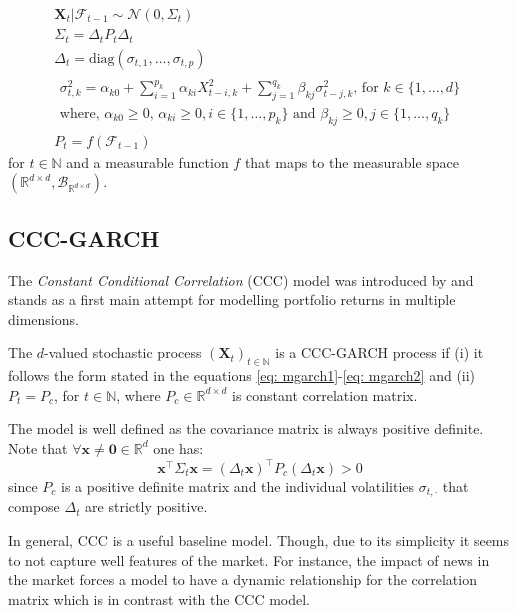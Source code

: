 \documentclass[a4paper, oneside]{discothesis}
\begin{document}
\begin{gather}
    \mathbf{X}_t|\mathcal{F}_{t-1}\sim\mathcal{N}(0, \Sigma_t)\label{eq: mgarch1}\\
    \Sigma_t = \Delta_t P_t \Delta_t\\
    \Delta_t = \text{diag}(\sigma_{t, 1}, \dots, \sigma_{t,p})\\
    \begin{split}\label{eq: mgarch2}
    \sigma_{t, k}^2 = \alpha_{k0}+\sum_{i=1}^{p_k}\alpha_{ki}X^2_{t-i, k}+\sum_{j=1}^{q_k}\beta_{kj}\sigma^2_{t-j, k}\text{, for }k\in\{1,\dots ,d \}\\ \text{where, } \alpha_{k0} \geq 0\text{, } \alpha_{ki}\geq0, i\in\{1, \dots, p_k\}\text{ and } \beta_{kj}\geq0, j\in\{1, \dots, q_k\}
    \end{split}\\
    P_t = f(\mathcal{F}_{t-1})
\end{gather}
for $t\in \mathbb{N}$ and a measurable function $f$ that maps to the measurable space $\left( \mathbb{R}^{d\times d}, \mathcal{B}_{\mathbb{R}^{d\times d}} \right)$.

\subsection{CCC-GARCH}
The \textit{Constant Conditional Correlation} (CCC) model was introduced by \cite{CCC} and stands as a first main attempt for modelling portfolio returns in multiple dimensions.

\begin{definition}
The $d$-valued stochastic process $(\mathbf{X}_t)_{t\in\mathbb{N}}$ is a CCC-GARCH process if (i) it follows the form stated in the equations \ref{eq: mgarch1}-\ref{eq: mgarch2} and (ii) $P_t = P_c$, for $t\in \mathbb{N}$, where $P_c\in\mathbb{R}^{d\times d}$ is constant correlation matrix. 
\end{definition}

  \begin{mdframed}\begin{remark}
The model is well defined as the covariance matrix is always positive definite. Note that $\forall \mathbf{x}\neq\mathbf{0}\in\mathbb{R}^d$ one has:
\[\mathbf{x}^\intercal\Sigma_t\mathbf{x} = \left(\Delta_t\mathbf{x}\right)^\intercal P_c \left(\Delta_t\mathbf{x}\right)>0\]
since $P_c$ is a positive definite matrix and the individual volatilities $\sigma_{t, \cdot}$ that compose $\Delta_t$ are strictly positive.
\end{remark}\end{mdframed}  
In general, CCC is a useful baseline model. Though, due to its simplicity it seems to not capture well features of the market. For instance, the impact of news in the market forces a model to have a dynamic relationship for the correlation matrix which is in contrast with the CCC model.
\end{document}
